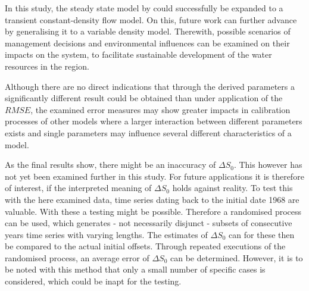 In this study, the steady state model by \textcite{Horn.2021} could successfully be expanded to a transient constant-density flow model. On this, future work can further advance by generalising it to a variable density model. Therewith, possible scenarios of management decisions and environmental influences can be examined on their impacts on the system, to facilitate sustainable development of the water resources in the region.

Although there are no direct indications that through the derived parameters a significantly different result could be obtained than under application of the $RMSE$, the examined error measures may show greater impacts in calibration processes of other models where a larger interaction between different parameters exists and single parameters may influence several different characteristics of a model.

As the final results show, there might be an inaccuracy of $\Delta S_0$. This however has not yet been examined further in this study. For future applications it is therefore of interest, if the interpreted meaning of $\Delta S_0$ holds against reality. To test this with the here examined data, time series dating back to the initial date 1968 are valuable. With these a testing might be possible. Therefore a randomised process can be used, which generates - not necessarily disjunct - subsets of consecutive years time series with varying lengths. The estimates of $\Delta S_0$ can for these then be compared to the actual initial offsets. Through repeated executions of the randomised process, an average error of $\Delta S_0$ can be determined. However, it is to be noted with this method that only a small number of specific cases is considered, which could be inapt for the testing.